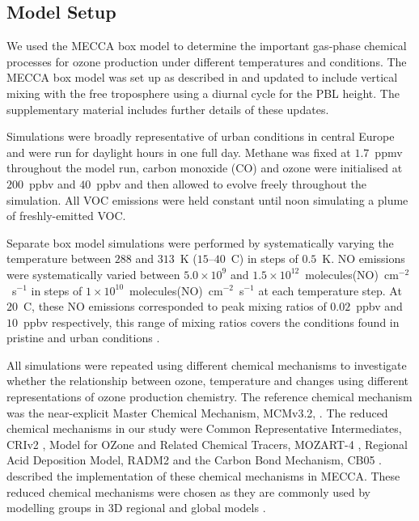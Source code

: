 \subsection{Model Setup} \label{ss:model_setup}
We used the MECCA box model \citep{Sander:2005} to determine the important gas-phase chemical processes for ozone production under different temperatures and  conditions.
The MECCA box model was set up as described in \citet{Coates:2015} and updated to include vertical mixing with the free troposphere using a diurnal cycle for the PBL height.
The supplementary material includes further details of these updates.

Simulations were broadly representative of urban conditions in central Europe and were run for daylight hours in one full day.
Methane was fixed at $1.7$~ppmv throughout the model run, carbon monoxide (CO) and ozone were initialised at $200$~ppbv and $40$~ppbv and then allowed to evolve freely throughout the simulation.
All VOC emissions were held constant until noon simulating a plume of freshly-emitted VOC.

Separate box model simulations were performed by systematically varying the temperature between $288$ and $313$~K ($15$--$40$~\degree C) in steps of $0.5$~K. 
NO emissions were systematically varied between \mbox{$5.0\times10^9$} and \mbox{$1.5\times10^{12}$~molecules(NO)~cm$^{-2}$~s$^{-1}$} in steps of \mbox{$1\times10^{10}$~molecules(NO)~cm$^{-2}$~s$^{-1}$} at each temperature step.
At $20$~\degree C, these NO emissions corresponded to peak  mixing ratios of $0.02$~ppbv and $10$~ppbv respectively, this range of  mixing ratios covers the  conditions found in pristine and urban conditions \citep{vonSchneidemesser:2015}.

All simulations were repeated using different chemical mechanisms to investigate whether the relationship between ozone, temperature and  changes using different representations of ozone production chemistry.
The reference chemical mechanism was the near-explicit Master Chemical Mechanism, MCMv3.2, \citep{Jenkin:1997, Jenkin:2003, Saunders:2003, MCM_Site}.
The reduced chemical mechanisms in our study were Common Representative Intermediates, CRIv2 \citep{Jenkin:2008}, Model for OZone and Related Chemical Tracers, MOZART-4 \citep{Emmons:2010}, Regional Acid Deposition Model, RADM2 \citep{Stockwell:1990} and the Carbon Bond Mechanism, CB05 \citep{Yarwood:2005}. 
\citet{Coates:2015} described the implementation of these chemical mechanisms in MECCA.
These reduced chemical mechanisms were chosen as they are commonly used by modelling groups in 3D regional and global models \citep{Baklanov:2014}.

